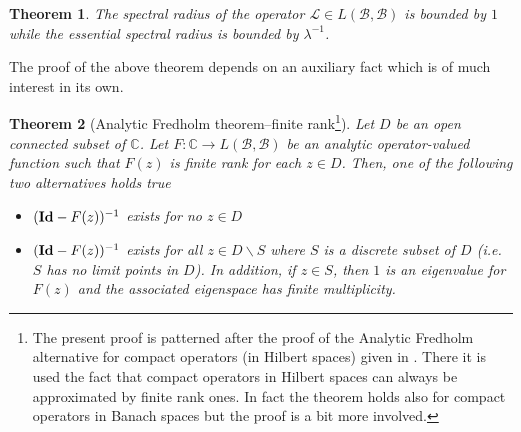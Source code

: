 \documentclass{amsart}
\numberwithin{equation}{section}
\newtheorem{thm}{Theorem}[section]
\newcommand\B{{\mathcal B}}
\newcommand\Lp{{\mathcal L}}
\newcommand\C{{\mathbb C}}
\newcommand\Id{\text{\bf Id}}
\begin{document}
\begin{thm}\label{thm:main}
The spectral radius of the operator $\Lp\in L(\B,\B)$ is bounded by
$1$ while the essential spectral radius is bounded by $\lambda^{-1}$.
\end{thm}

The proof of the above theorem depends on an auxiliary fact which is of
much interest in its own.

\begin{thm}[Analytic Fredholm theorem--finite rank\footnote{The present proof is
patterned after the proof of the Analytic Fredholm alternative for
compact operators (in Hilbert spaces) given in \cite[Theorem
VI.14]{RS}. There it is used the fact that compact operators in
Hilbert spaces can always be approximated by finite rank ones. In fact
the theorem holds also for compact operators in Banach spaces but the
proof is a bit more involved.}]\label{thm:fredholm}
Let $D$ be an open connected subset of $\C$. Let $F:\C\to L(\B,\B)$ be
an analytic operator-valued function such that $F(z)$ is finite rank
for each $z\in D$. Then, one of the following two alternatives holds true
\begin{itemize}
\item $(\Id-F(z))^{-1}$ exists for no $z\in D$
\item $(\Id-F(z))^{-1}$ exists for all $z\in D\backslash S$ where $S$
is a discrete subset of $D$ (i.e. $S$ has no limit points in $D$). In addition, if
$z\in S$, then $1$ is an eigenvalue for 
$F(z)$ and the associated eigenspace has finite multiplicity.
\end{itemize}
\end{thm}
\end{document}
